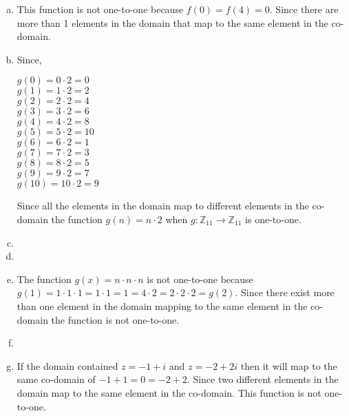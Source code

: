 \begin{enumerate}[(a)]
\item \label{modular_m}
This function is not one-to-one because $f(0)=f(4)=0$. Since there are more than 1 elements in the domain that map to the same element in the co-domain. 

\item \label{modular_m2}
Since,
\begin{multicols}{3}
$g(0) = 0 \cdot 2 = 0$\\
$g(1) = 1 \cdot 2 = 2$\\
$g(2) = 2 \cdot 2 = 4$\\
$g(3) = 3 \cdot 2 = 6$\\
$g(4) = 4 \cdot 2 = 8$\\
$g(5) = 5 \cdot 2 = 10$\\
$g(6) = 6 \cdot 2 = 1$\\
$g(7) = 7 \cdot 2 = 3$\\
$g(8) = 8 \cdot 2 = 5$\\
$g(9) = 9 \cdot 2 = 7 $\\
$g(10) = 10 \cdot 2 = 9$
\end{multicols}
Since all the elements in the domain map to different elements in the co-domain the function $g(n)=n\cdot 2$ when $g\colon {\mathbb Z}_{11}\to {\mathbb Z}_{11} $ is one-to-one.

\item 

\item 

\item 
The function $g(x)=n\cdot n\cdot n$ is not one-to-one because\\ 
$g(1)=1\cdot 1\cdot 1=1\cdot 1=1=4\cdot 2=2\cdot 2\cdot 2=g(2)$. Since there exist more than one element in the domain mapping to the same element in the co-domain the function is not one-to-one.

\item

\item
If the domain contained $z=-1+i$ and $z=-2+2i$ then it will map to the same co-domain of $-1+1=0=-2+2$. Since two different elements in the domain map to the same element in the co-domain. This function is not one-to-one.
\end{enumerate}

